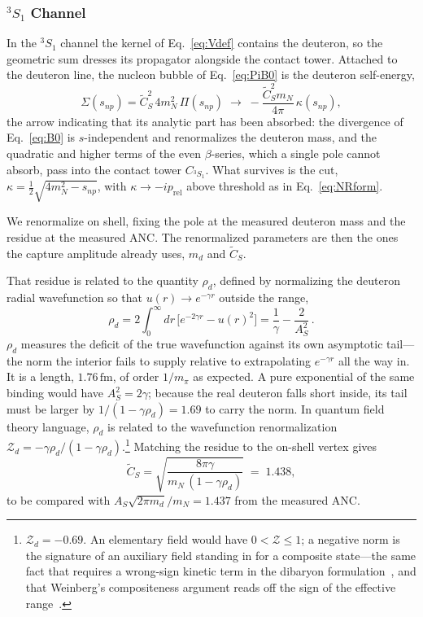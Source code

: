 \documentclass[
  aps,prd,twocolumn,nofootinbib,superscriptaddress,
  longbibliography,floatfix,preprintnumbers
]{revtex4-2}
\newcommand{\prel}{p_{\mathrm{rel}}}
\newcommand{\AS}{A_{S}}
\newcommand{\CSv}{\tilde{C}_{S}}
\begin{document}
\subsubsection{${}^{3}S_1$ Channel}

In the ${}^{3}S_1$ channel the kernel of Eq.~\eqref{eq:Vdef} contains the
deuteron, so the geometric sum dresses its propagator alongside the contact
tower. Attached to the deuteron line, the nucleon bubble of
Eq.~\eqref{eq:PiB0} is the deuteron self-energy,
\begin{equation}
  \Sigma(s_{np}) = \CSv^{2}\,4m_{N}^{2}\,\Pi(s_{np})
  \;\longrightarrow\; -\frac{\CSv^{2}m_{N}}{4\pi}\,\kappa(s_{np}),
  \label{eq:Sigren}
\end{equation}
the arrow indicating that its analytic part has been absorbed: the divergence
of Eq.~\eqref{eq:B0} is $s$-independent and renormalizes the deuteron mass, and
the quadratic and higher terms of the even $\beta$-series, which a single pole
cannot absorb, pass into the contact tower $C_{^3S_1}$. What survives is the
cut, $\kappa=\tfrac12\sqrt{4m_{N}^{2}-s_{np}}$, with $\kappa\to-i\prel$ above
threshold as in Eq.~\eqref{eq:NRform}.

We renormalize on shell, fixing the pole at the measured deuteron mass and the
residue at the measured ANC. The renormalized parameters are then the ones the
capture amplitude already uses, $m_{d}$ and $\CSv$.

That residue is related to the quantity $\rho_{d}$, defined by normalizing the deuteron radial
wavefunction so that $u(r)\to e^{-\gamma r}$ outside the range,
\begin{equation}
  \rho_{d} = 2\int_{0}^{\infty}\!\!dr\,\Big[e^{-2\gamma r}-u(r)^{2}\Big]
           = \frac{1}{\gamma}-\frac{2}{\AS^{2}}\,.
  \label{eq:rhoint}
\end{equation}
$\rho_{d}$ measures the deficit of the true wavefunction against its own
asymptotic tail---the norm the interior fails to supply relative to
extrapolating $e^{-\gamma r}$ all the way in. It is a length,
$1.76\,\mathrm{fm}$, of order $1/m_\pi$ as expected. 
A pure exponential of the same binding would have $\AS^{2}=2\gamma$;
because the real deuteron falls short inside, its tail must be larger by
$1/(1-\gamma\rho_{d})=1.69$ to carry the norm. In quantum field theory language,
$\rho_d$ is related to the wavefunction renormalization
$\mathcal{Z}_{d}=-\gamma\rho_{d}/(1-\gamma\rho_{d})$.\footnote{$\mathcal{Z}_{d}=-0.69$. An elementary field would have
$0<\mathcal{Z}\le1$; a negative norm is the signature of an auxiliary field
standing in for a composite state---the same fact that requires a wrong-sign
kinetic term in the dibaryon formulation~\cite{Kaplan:1996nv}, and that
Weinberg's compositeness argument reads off the sign of the effective
range~\cite{Weinberg:1965zz}.}
Matching the residue to the on-shell vertex gives
\begin{equation}
  \CSv = \sqrt{\frac{8\pi\gamma}{m_{N}\,(1-\gamma\rho_{d})}} \;=\; 1.438 ,
  \label{eq:CSgd}
\end{equation}
to be compared with $\AS\sqrt{2\pi m_{d}}/m_{N}=1.437$ from the measured ANC. 
\end{document}
